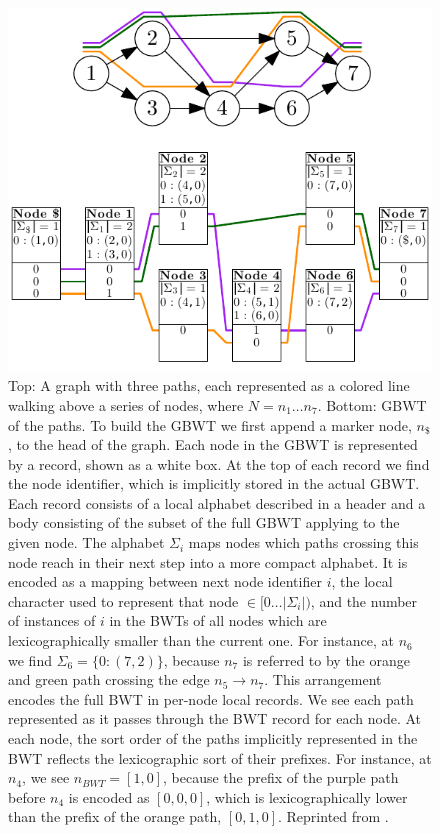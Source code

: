 \begin{figure}[htbp!]
  \includegraphics[width=\textwidth]{Chapter2/Figs/gbwt-example.pdf}
  \caption[The Graph Burrows Wheeler Transform]{
    Top: A graph with three paths, each represented as a colored line walking above a series of nodes, where $N={n_1\ldots n_7}$.
    Bottom: GBWT of the paths.
    To build the GBWT we first append a marker node, $n_\$$, to the head of the graph.
    Each node in the GBWT is represented by a record, shown as a white box.
    At the top of each record we find the node identifier, which is implicitly stored in the actual GBWT.
    Each record consists of a local alphabet described in a header and a body consisting of the subset of the full GBWT applying to the given node.
    The alphabet $\Sigma_i$ maps nodes which paths crossing this node reach in their next step into a more compact alphabet.
    It is encoded as a mapping between next node identifier $i$, the local character used to represent that node $\in [0 \ldots |\Sigma_i|)$, and the number of instances of $i$ in the BWTs of all nodes which are lexicographically smaller than the current one.
    For instance, at $n_6$ we find $\Sigma_6 = \{ 0: (7, 2) \}$, because $n_7$ is referred to by the orange and green path crossing the edge $n_5 \to n_7$.
    This arrangement encodes the full BWT in per-node local records.
    We see each path represented as it passes through the BWT record for each node.
    At each node, the sort order of the paths implicitly represented in the BWT reflects the lexicographic sort of their prefixes.
    For instance, at $n_4$, we see $n_{BWT} = [1, 0]$, because the prefix of the purple path before $n_4$ is encoded as $[0,0,0]$, which is lexicographically lower than the prefix of the orange path, $[0,1,0]$.
    Reprinted from \cite{siren2018haplotype}.
  }
  \label{fig:gbwt-example}
\end{figure}

